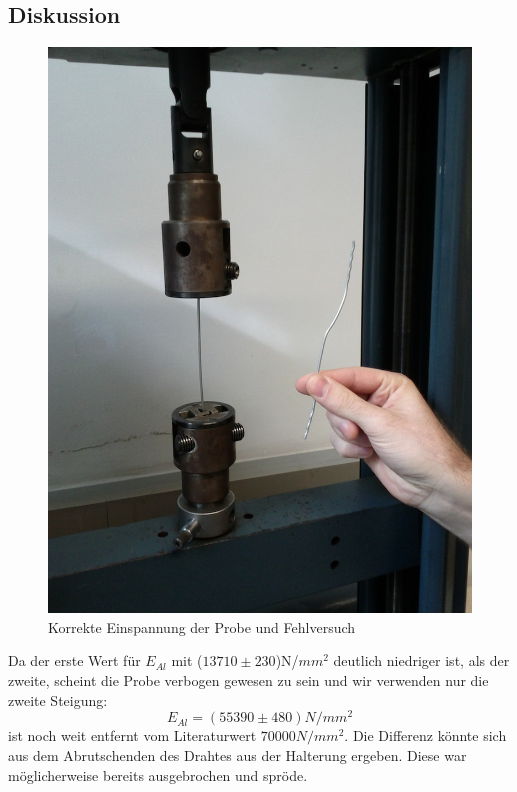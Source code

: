 \documentclass[12pt,a4paper]{article}
\begin{document}
\begin{multicols}{2}
\section{Diskussion}
\begin{figure}[H]
	\centering
  	\includegraphics[scale=0.25]{./figure/zugversuch_fail.jpg}
	\caption{Korrekte Einspannung der Probe und Fehlversuch}
	\label{fig:draht_fehlversuch}
\end{figure}
\noindent
Da der erste Wert für $E_{Al}$ mit ($13710 \pm 230$)N/$mm^2$ deutlich niedriger ist, als der zweite, scheint die Probe verbogen gewesen zu sein und wir verwenden nur die zweite Steigung: 
$$E_{Al}=(55390 \pm 480)N/mm^2$$ 
ist noch weit entfernt vom Literaturwert $70000 N/mm^2$. Die Differenz könnte sich aus dem Abrutschenden des Drahtes aus der Halterung ergeben. Diese war möglicherweise bereits ausgebrochen und spröde. \\

\end{multicols}
\end{document}
